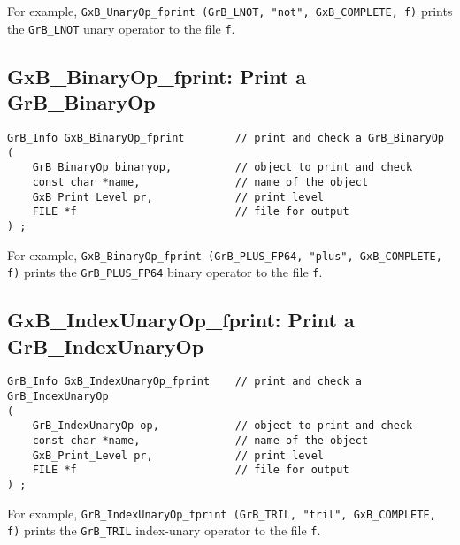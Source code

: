 \documentclass[12pt]{article}
\begin{document}
For example,
\verb'GxB_UnaryOp_fprint (GrB_LNOT, "not", GxB_COMPLETE, f)'
prints the \verb'GrB_LNOT' unary operator to the file \verb'f'.


\subsection{{\sf GxB\_BinaryOp\_fprint:} Print a {\sf GrB\_BinaryOp}}

\begin{mdframed}[userdefinedwidth=6in]
{\footnotesize
\begin{verbatim}
GrB_Info GxB_BinaryOp_fprint        // print and check a GrB_BinaryOp
(
    GrB_BinaryOp binaryop,          // object to print and check
    const char *name,               // name of the object
    GxB_Print_Level pr,             // print level
    FILE *f                         // file for output
) ;
\end{verbatim} } \end{mdframed}

For example,
\verb'GxB_BinaryOp_fprint (GrB_PLUS_FP64, "plus", GxB_COMPLETE, f)' prints the
\verb'GrB_PLUS_FP64' binary operator to the file \verb'f'.


\subsection{{\sf GxB\_IndexUnaryOp\_fprint:} Print a {\sf GrB\_IndexUnaryOp}}

\begin{mdframed}[userdefinedwidth=6in]
{\footnotesize
\begin{verbatim}
GrB_Info GxB_IndexUnaryOp_fprint    // print and check a GrB_IndexUnaryOp
(
    GrB_IndexUnaryOp op,            // object to print and check
    const char *name,               // name of the object
    GxB_Print_Level pr,             // print level
    FILE *f                         // file for output
) ;
\end{verbatim} } \end{mdframed}

For example,
\verb'GrB_IndexUnaryOp_fprint (GrB_TRIL, "tril", GxB_COMPLETE, f)' prints
the \verb'GrB_TRIL' index-unary operator to the file \verb'f'.
\end{document}

